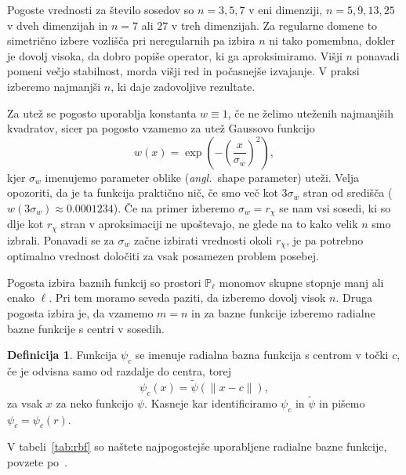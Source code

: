 \documentclass[12pt,a4paper]{article}
\theoremstyle{definition} %
\newtheorem{definicija}{Definicija}[section]
\theoremstyle{plain} %
\numberwithin{equation}{section}
\newcommand{\ang}[1]{(\textit{angl.}\ #1)}
\begin{document}
Pogoste vrednosti za število sosedov so $n = 3, 5, 7$ v eni dimenziji, $n = 5,
9, 13, 25$ v dveh dimenzijah in $n = 7$ ali $27$ v treh dimenzijah. Za regularne
domene to simetrično izbere vozlišča pri neregularnih pa izbira $n$ ni tako
pomembna, dokler je dovolj visoka, da dobro popiše operator, ki ga aproksimiramo.
Višji $n$ ponavadi pomeni večjo stabilnost, morda višji red in počasnejše
izvajanje. V praksi izberemo najmanjši $n$, ki daje zadovoljive rezultate.

Za utež se pogosto uporablja konstanta $w\equiv1$, če ne želimo uteženih
najmanjših kvadratov, sicer pa pogosto vzamemo za utež Gaussovo funkcijo
\[
  w(x) = \exp\left(-\left(\frac{x}{\sigma_w}\right)^2 \right),
\]
kjer $\sigma_w$ imenujemo parameter oblike \ang{shape parameter} uteži.
Velja opozoriti, da je ta funkcija praktično nič, če smo več kot $3\sigma_w$
stran od središča ($w(3\sigma_w) \approx 0.0001234$). Če na primer izberemo
$\sigma_w = r_\chi$ se nam vsi sosedi, ki so dlje kot $r_\chi$ stran v
aproksimaciji ne upoštevajo, ne glede na to kako velik $n$ smo izbrali.
Ponavadi se za $\sigma_w$ začne izbirati vrednosti okoli $r_\chi$, je
pa potrebno optimalno vrednost določiti za vsak posamezen problem posebej.

Pogosta izbira baznih funkcij so prostori $\mathbb{P}_\ell$ monomov skupne
stopnje manj ali enako $\ell$. Pri tem moramo seveda paziti, da izberemo dovolj
visok $n$. Druga pogosta izbira je, da vzamemo $m = n$ in za bazne funkcije
izberemo radialne bazne funkcije s centri v sosedih.

\begin{definicija}
  Funkcija $\psi_c$ se imenuje radialna bazna funkcija s centrom v točki
  $c$,
  če je odvisna samo od razdalje do centra, torej \[
    \psi_c(x) = \tilde\psi(\|x - c\|),
  \]
  za vsak $x$ za neko funkcijo $\psi$. Kasneje kar identificiramo $\psi_c$
  in $\tilde\psi$ in pišemo $\psi_c = \psi_c(r)$.
\end{definicija}

V tabeli~\ref{tab:rbf} so naštete najpogostejše uporabljene radialne bazne funkcije, povzete
po~\cite[str.\ 5]{schaback1995error}.
\end{document}

